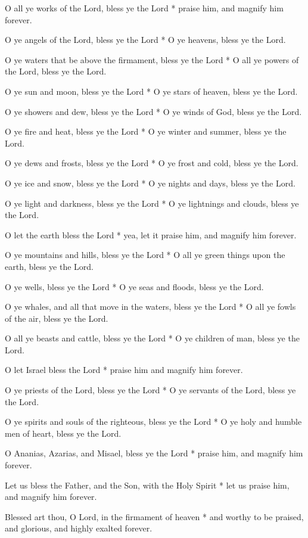 O all ye works of the Lord, bless ye the Lord * praise him, and magnify him forever.

O ye angels of the Lord, bless ye the Lord * O ye heavens, bless ye the Lord.

O ye waters that be above the firmament, bless ye the Lord * O all ye powers of the Lord, bless ye the Lord.

O ye sun and moon, bless ye the Lord * O ye stars of heaven, bless ye the Lord.

O ye showers and dew, bless ye the Lord * O ye winds of God, bless ye the Lord.

O ye fire and heat, bless ye the Lord * O ye winter and summer, bless ye the Lord.

O ye dews and frosts, bless ye the Lord * O ye frost and cold, bless ye the Lord.

O ye ice and snow, bless ye the Lord * O ye nights and days, bless ye the Lord.

O ye light and darkness, bless ye the Lord * O ye lightnings and clouds, bless ye the Lord.

O let the earth bless the Lord * yea, let it praise him, and magnify him forever.

O ye mountains and hills, bless ye the Lord * O all ye green things upon the earth, bless ye the Lord.

O ye wells, bless ye the Lord * O ye seas and floods, bless ye the Lord.

O ye whales, and all that move in the waters, bless ye the Lord * O all ye fowls of the air, bless ye the Lord.

O all ye beasts and cattle, bless ye the Lord * O ye children of man, bless ye the Lord.

O let Israel bless the Lord * praise him and magnify him forever.

O ye priests of the Lord, bless ye the Lord * O ye servants of the Lord, bless ye the Lord.

O ye spirits and souls of the righteous, bless ye the Lord * O ye holy and humble men of heart, bless ye the Lord.

O Ananias, Azarias, and Misael, bless ye the Lord * praise him, and magnify him forever.

Let us bless the Father, and the Son, with the Holy Spirit * let us praise him, and magnify him forever.

Blessed art thou, O Lord, in the firmament of heaven * and worthy to be praised, and glorious, and highly exalted forever.